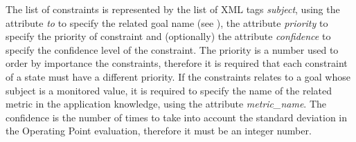 The list of constraints is represented by the list of XML tags \textit{subject}, using the attribute \textit{to} to specify the related goal name (see ), the attribute \textit{priority} to specify the priority of constraint and (optionally) the attribute \textit{confidence} to specify the confidence level of the constraint.
The priority is a number used to order by importance the constraints, therefore it is required that each constraint of a state must have a different priority.
If the constraints relates to a goal whose subject is a monitored value, it is required to specify the name of the related metric in the application knowledge, using the attribute \textit{metric\_name}.
The confidence is the number of times to take into account the standard deviation in the Operating Point evaluation, therefore it must be an integer number.





















